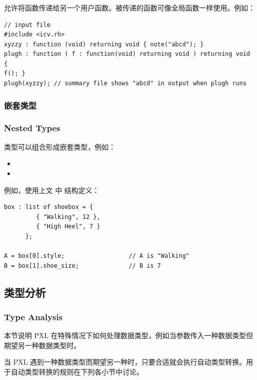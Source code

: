 \subsubsection{}

允许将函数传递给另一个用户函数。被传递的函数可像全局函数一样使用。例如：
\begin{lstlisting}[style=pxl]
// input file
#include <icv.rh>
xyzzy : function (void) returning void { note("abcd"); }
plugh : function ( f : function(void) returning void ) returning void {
f(); }
plugh(xyzzy); // summary file shows "abcd" in output when plugh runs
\end{lstlisting}

\subsubsection{嵌套类型}
\subsubsection*{Nested Types}

类型可以组合形成嵌套类型，例如：
\begin{itemize}
  \item {}
  \item {}
\end{itemize}

例如，使用上文  中  结构定义：
\begin{lstlisting}[style=pxl]
box : list of shoebox = {
         { "Walking", 12 },
         { "High Heel", 7 }
      };

A = box[0].style;                  // A is "Walking"
B = box[1].shoe_size;              // B is 7
\end{lstlisting}

\subsection{类型分析}
\subsubsection*{Type Analysis}

本节说明 PXL 在特殊情况下如何处理数据类型，例如当参数传入一种数据类型但期望另一种数据类型时。

当 PXL 遇到一种数据类型而期望另一种时，只要合适就会执行自动类型转换。用于自动类型转换的规则在下列各小节中讨论。

